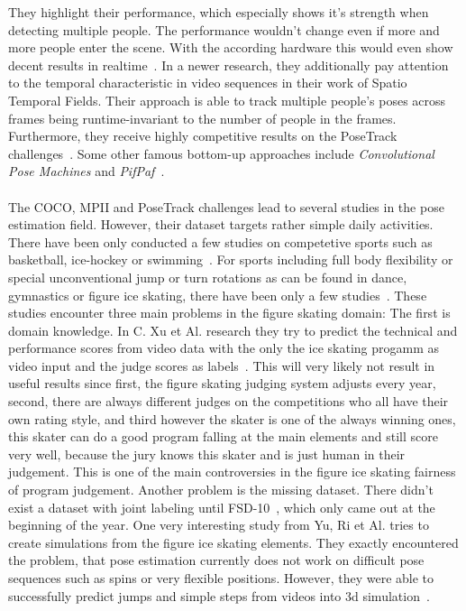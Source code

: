     They highlight their performance, which especially shows it's strength when detecting multiple people.
    The performance wouldn't change even if more and more people enter the scene.
    With the according hardware this would even show decent results in realtime~\cite{openpose}.
    In a newer research, they additionally pay attention to the temporal characteristic in video sequences in
    their work of Spatio Temporal Fields.
    Their approach is able to track multiple people's poses across frames being runtime-invariant to the number
    of people in the frames.
    Furthermore, they receive highly competitive results on the PoseTrack challenges~\cite{staf}.
    Some other famous bottom-up approaches include \textit{Convolutional Pose Machines} and
    \textit{PifPaf}~\cite{convpose, pifpaf}.
\\\mbox{}\\
    The COCO, MPII and PoseTrack challenges lead to several studies in the pose estimation field.
    However, their dataset targets rather simple daily activities.
    There have been only conducted a few studies on competetive sports such as basketball, ice-hockey or
    swimming~\cite{synergetic, posehockey, swimm}.
    For sports including full body flexibility or special unconventional jump or turn rotations as can be found
    in dance, gymnastics or figure ice skating,
    there have been only a few studies~\cite{dance, figureskatingsimulation, scorefigureskating, fsd10}.
    These studies encounter three main problems in the figure skating domain:
    The first is domain knowledge.
    In C. {Xu} et Al. research they try to predict the technical and performance scores from video data with the
    only the
    ice skating progamm as video input and the judge scores as labels~\cite{scorefigureskating}.
    This will very likely not result in useful results since first, the figure skating judging system adjusts
    every year,
    second, there are always different judges on the competitions who all have their own rating style, and third
    however the skater is one of the always winning
    ones, this skater can do a good program falling at the main elements and still score very well, because the
    jury knows this skater and is just human in
    their judgement.
    This is one of the main controversies in the figure ice skating fairness of program judgement.
    Another problem is the missing dataset.
    There didn't exist a dataset with joint labeling until FSD-10~\cite{fsd10}, which only came out at the
    beginning of the year.
    One very interesting study from Yu, Ri et Al. tries to create simulations from the figure ice skating elements.
    They exactly encountered the problem, that pose estimation currently does not work on difficult pose sequences
    such as spins or very flexible positions.
    However, they were able to successfully predict jumps and simple steps from videos into 3d
    simulation~\cite{simplebaselines}.
\\\mbox{}\\
